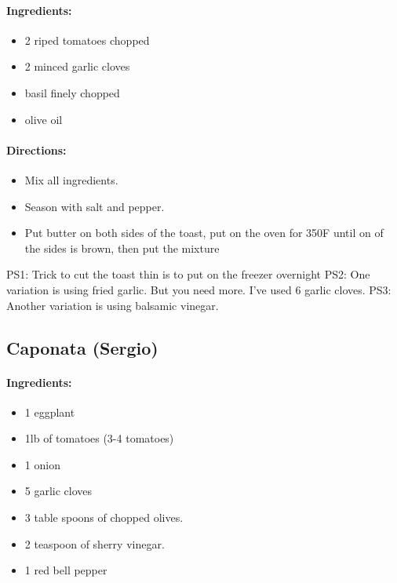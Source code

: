 \documentclass{article}
\begin{document}
\paragraph{Ingredients:}

\begin{itemize}
	\item 2 riped tomatoes chopped
	\item 2 minced garlic cloves
	\item basil finely chopped
	\item olive oil
\end{itemize}

\paragraph{Directions:}
\begin{itemize}
	\item Mix all ingredients.
	\item Season with salt and pepper.
	\item Put butter on both sides of the toast, put on the oven for 350F until on of the sides is brown, then put the mixture
\end{itemize}

PS1: Trick to cut the toast thin is to put on the freezer overnight
PS2: One variation is using fried garlic. But you need more. I've used 6 garlic cloves.
PS3: Another variation is using balsamic vinegar.

\subsection{Caponata (Sergio)}

\paragraph{Ingredients:}

\begin{itemize}
	\item 1 eggplant
	\item 1lb of tomatoes (3-4 tomatoes)
	\item 1 onion
	\item 5 garlic cloves
	\item 3 table spoons of chopped olives.
	\item 2 teaspoon of sherry vinegar.
	\item 1 red bell pepper
\end{itemize}
\end{document}
